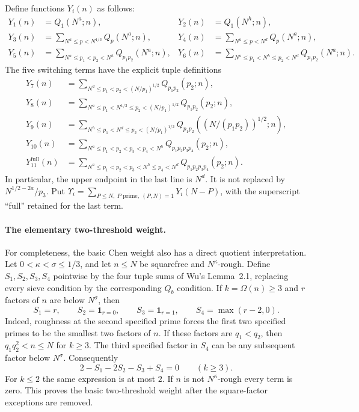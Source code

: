 \documentclass[11pt]{article}
\begin{document}
Define functions $Y_i(n)$ as follows:
\begin{align*}
 Y_1(n)&=Q_1(N^a;n),&Y_2(n)&=Q_1(N^h;n),\\
 Y_3(n)&=\sum_{N^a\le p<N^{1/3}}Q_p(N^a;n),&
 Y_4(n)&=\sum_{N^a\le p<N^d}Q_p(N^a;n),\\
 Y_5(n)&=\sum_{N^a\le p_1<p_2<N^h}Q_{p_1p_2}(N^a;n),&
 Y_6(n)&=\sum_{N^a\le p_1<N^h\le p_2<N^d}Q_{p_1p_2}(N^a;n).
\end{align*}
The five switching terms have the explicit tuple definitions
\begin{align*}
 Y_7(n)&=\sum_{N^d\le p_1<p_2<(N/p_1)^{1/2}}
           Q_{p_1p_2}(p_2;n),\\
 Y_8(n)&=\sum_{N^a\le p_1<N^{1/3}\le p_2<(N/p_1)^{1/2}}
           Q_{p_1p_2}(p_2;n),\\
 Y_9(n)&=\sum_{N^h\le p_1<N^d\le p_2<(N/p_1)^{1/2}}
           Q_{p_1p_2}((N/(p_1p_2))^{1/2};n),\\
 Y_{10}(n)&=\sum_{N^a\le p_1<p_2<p_3<p_4<N^h}
           Q_{p_1p_2p_3p_4}(p_2;n),\\
 Y_{11}^{\mathrm{full}}(n)&=
   \sum_{N^a\le p_1<p_2<p_3<N^h\le p_4<N^d}
           Q_{p_1p_2p_3p_4}(p_2;n).
\end{align*}
In particular, the upper endpoint in the last line is $N^d$.
It is not replaced by $N^{1/2-2a}/p_3$.
Put $\Upsilon_i=\sum_{P\le N,\ P\text{ prime},\ (P,N)=1}Y_i(N-P)$,
with the superscript ``full'' retained for the last term.

\paragraph{The elementary two-threshold weight.}
For completeness, the basic Chen weight also has a direct quotient
interpretation. Let $0<\kappa<\sigma\le1/3$, and let $n\le N$ be
squarefree and $N^\kappa$-rough. Define $S_1,S_2,S_3,S_4$ pointwise
by the four tuple sums of Wu's Lemma~2.1, replacing every sieve condition
by the corresponding $Q_b$ condition. If $k=\Omega(n)\ge3$ and
$r$ factors of $n$ are below $N^\sigma$, then
\[
 S_1=r,\qquad S_2=\mathbf1_{r=0},\qquad
 S_3=\mathbf1_{r=1},\qquad S_4=\max(r-2,0).
\]
Indeed, roughness at the second specified prime forces the first two
specified primes to be the smallest two factors of $n$. If these factors
are $q_1<q_2$, then $q_1q_2^2<n\le N$ for $k\ge3$.
The third specified factor in $S_4$ can be any subsequent factor below
$N^\sigma$. Consequently
\[
 2-S_1-2S_2-S_3+S_4=0\qquad(k\ge3).
\]
For $k\le2$ the same expression is at most $2$.
If $n$ is not $N^\kappa$-rough every term is zero. This proves the
basic two-threshold weight after the square-factor exceptions are removed.
\end{document}
